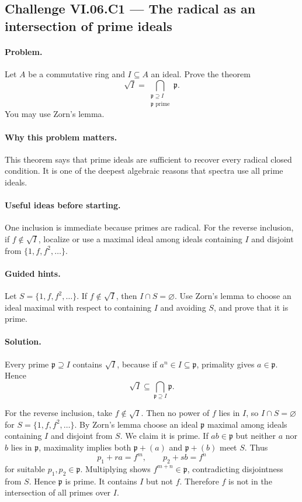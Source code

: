 \subsection*{Challenge VI.06.C1 --- The radical as an intersection of prime ideals}
\label{chal:vi-06-c1}

\paragraph{Problem.}
Let \(A\) be a commutative ring and \(I\subseteq A\) an ideal.  Prove the theorem
\[
\sqrt I
=
\bigcap_{\substack{\mathfrak p\supseteq I\\ \mathfrak p\text{ prime}}}\mathfrak p.
\]
You may use Zorn's lemma.

\ifdefined\FullProblemDossiers
\paragraph{Why this problem matters.}
This theorem says that prime ideals are sufficient to recover every radical closed
condition.  It is one of the deepest algebraic reasons that spectra use all prime ideals.

\paragraph{Useful ideas before starting.}
One inclusion is immediate because primes are radical.  For the reverse inclusion, if
\(f\notin\sqrt I\), localize or use a maximal ideal among ideals containing \(I\) and
disjoint from \(\{1,f,f^2,\dots\}\).

\paragraph{Guided hints.}
Let \(S=\{1,f,f^2,\dots\}\).  If \(f\notin\sqrt I\), then \(I\cap S=\varnothing\).  Use
Zorn's lemma to choose an ideal maximal with respect to containing \(I\) and avoiding \(S\),
and prove that it is prime.

\paragraph{Solution.}
Every prime \(\mathfrak p\supseteq I\) contains \(\sqrt I\), because if
\(a^n\in I\subseteq\mathfrak p\), primality gives \(a\in\mathfrak p\).  Hence
\[
\sqrt I\subseteq\bigcap_{\mathfrak p\supseteq I}\mathfrak p.
\]

For the reverse inclusion, take \(f\notin\sqrt I\).  Then no power of \(f\) lies in \(I\),
so \(I\cap S=\varnothing\) for \(S=\{1,f,f^2,\dots\}\).  By Zorn's lemma choose an ideal
\(\mathfrak p\) maximal among ideals containing \(I\) and disjoint from \(S\).  We claim it
is prime.  If \(ab\in\mathfrak p\) but neither \(a\) nor \(b\) lies in \(\mathfrak p\),
maximality implies both \(\mathfrak p+(a)\) and \(\mathfrak p+(b)\) meet \(S\).  Thus
\[
p_1+r a=f^m,\qquad p_2+s b=f^n
\]
for suitable \(p_1,p_2\in\mathfrak p\).  Multiplying shows \(f^{m+n}\in\mathfrak p\),
contradicting disjointness from \(S\).  Hence \(\mathfrak p\) is prime.  It contains \(I\)
but not \(f\).  Therefore \(f\) is not in the intersection of all primes over \(I\).


